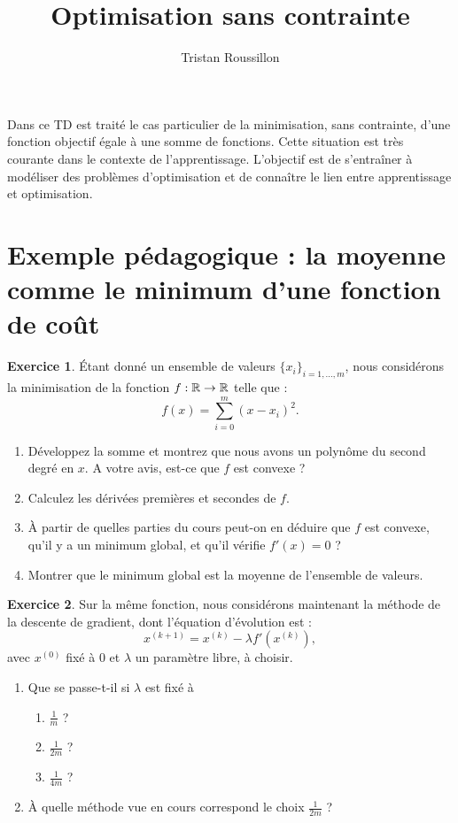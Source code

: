 \documentclass[a4paper,francais]{article}
\title{Optimisation sans contrainte}
\author{Tristan Roussillon}
\newcommand{\R}{{\ensuremath\mathbb{R}}}
\theoremstyle{definition}
\newtheorem{exercice}{Exercice}[section]
\begin{document}
\maketitle

Dans ce TD est traité le cas particulier de la minimisation, sans contrainte,
d'une fonction objectif égale à une somme de fonctions. Cette situation est
très courante dans le contexte de l'apprentissage. L'objectif est de s'entraîner
à modéliser des problèmes d'optimisation et de connaître le lien entre apprentissage
et optimisation. 

\section{Exemple pédagogique : la moyenne comme le minimum d'une fonction de coût}
\label{sec:moyenne}

\begin{exercice}
  \'Etant donné un ensemble de valeurs $\{x_i\}_{i = 1,\dots,m}$,
  nous considérons la minimisation de la fonction $f : \R \rightarrow \R$ telle que :
  \[ f(x) = \sum_{i=0}^m (x-x_i)^2. \] 
  
  \begin{enumerate}
  \item Développez la somme et montrez que nous avons un polynôme du second degré en $x$.
    A votre avis, est-ce que $f$ est convexe ?
  \item Calculez les dérivées premières et secondes de $f$.
  \item \`A partir de quelles parties du cours peut-on en déduire que $f$ est convexe,
    qu'il y a un minimum global, et qu'il vérifie $f'(x) = 0$ ?
  \item Montrer que le minimum global est la moyenne de l'ensemble de valeurs.
  \end{enumerate}
\end{exercice}

\begin{exercice}  
  Sur la même fonction, nous considérons maintenant la méthode de la descente de gradient,
  dont l'équation d'évolution est :
  \[ x^{(k+1)} = x^{(k)} - \lambda f'(x^{(k)}), \]
  avec $x^{(0)}$ fixé à $0$ et $\lambda$ un paramètre libre, à choisir. 
  \begin{enumerate}
  \item Que se passe-t-il si $\lambda$ est fixé à
    \begin{enumerate}
    \item $\frac{1}{m}$ ?
    \item $\frac{1}{2m}$ ?
    \item $\frac{1}{4m}$ ?
    \end{enumerate}
  \item \`A quelle méthode vue en cours correspond le choix $\frac{1}{2m}$ ?
  \end{enumerate}
\end{exercice}
\end{document}
